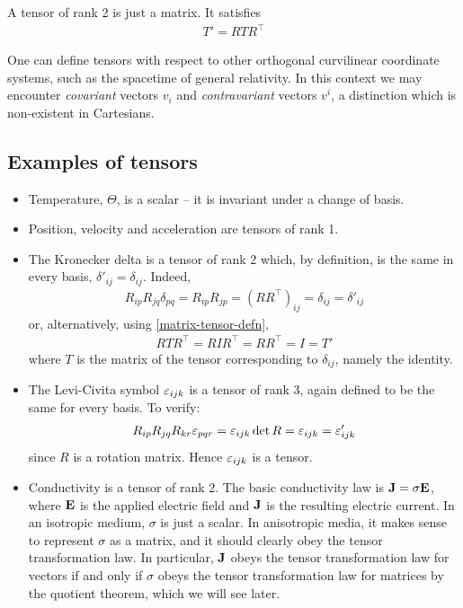 \documentclass{../../template/note}
\begin{document}
    \begin{proposition}
        \label{matrix-tensor-defn}
        A tensor of rank 2 is just a matrix. It satisfies
        \begin{align*}
            T' = RTR^\intercal 
        \end{align*}
    \end{proposition}
    
    \begin{remark*}
        One can define tensors with respect to other orthogonal curvilinear coordinate systems, such as the spacetime of general relativity. In this context we may encounter \emph{covariant} vectors \(v_i\) and \emph{contravariant} vectors \(v^i\), a distinction which is non-existent in Cartesians.
    \end{remark*}
    
    \subsection{Examples of tensors}

    \begin{itemize}
        \item Temperature, \(\Theta\), is a scalar -- it is invariant under a change of basis.
        \item Position, velocity and acceleration are tensors of rank 1.
        \item The Kronecker delta is a tensor of rank 2 which, by definition, is the same in every basis, \(\delta'_{ij} = \delta_{ij}\). Indeed,
        \begin{align*}
            R_{ip} R_{jq} \delta_{pq} = R_{ip} R_{jp} = (RR^\intercal)_{ij} = \delta_{ij} = \delta'_{ij}
        \end{align*}
        or, alternatively, using \cref{matrix-tensor-defn},
        \begin{align*}
            RTR^\intercal = RIR^\intercal = RR^\intercal = I = T'
        \end{align*}
        where \(T\) is the matrix of the tensor corresponding to \(\delta_{ij}\), namely the identity.
        \item The Levi-Civita symbol \(\varepsilon_{ijk}\) is a tensor of rank 3, again defined to be the same for every basis. To verify:
        \begin{align*}
            R_{ip}R_{jq}R_{kr}\varepsilon_{pqr} = \varepsilon_{ijk} \det R = \varepsilon_{ijk} = \varepsilon'_{ijk}
        \end{align*}
        since \(R\) is a rotation matrix. Hence \(\varepsilon_{ijk}\) is a tensor.
        \item Conductivity is a tensor of rank 2. The basic conductivity law is \(\V J = \sigma \V E\), where \(\V E\) is the applied electric field and \(\V J\) is the resulting electric current. In an isotropic medium, \(\sigma\) is just a scalar. In anisotropic media, it makes sense to represent \(\sigma\) as a matrix, and it should clearly obey the tensor transformation law. In particular, \(\V J\) obeys the tensor transformation law for vectors if and only if \(\sigma\) obeys the tensor transformation law for matrices by the quotient theorem, which we will see later.
    \end{itemize}
    
\end{document}
